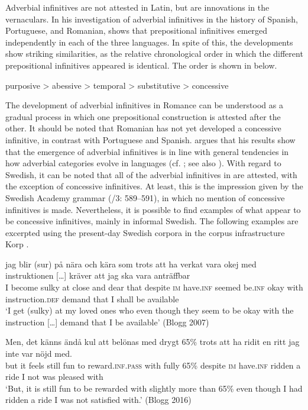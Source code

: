\documentclass[output=paper]{langscibook}
\begin{document}
Adverbial infinitives are not attested in Latin, but are innovations in the vernaculars. In his investigation of adverbial infinitives in the history of Spanish, Portuguese, and Romanian, \citet{Schulte2007Prepositional,Schulte2007What} shows that prepositional infinitives emerged independently in each of the three languages. In spite of this, the developments show striking similarities, as the relative chronological order in which the different prepositional infinitives appeared is identical. The order is shown in  below. 


\ea \label{ex:kalm:6}
purposive > abessive > temporal > substitutive > concessive
\z

The development of adverbial infinitives in Romance can be understood as a gradual process in which one prepositional construction is attested after the other. It should be noted that Romanian has not yet developed a concessive infinitive, in contrast with Portuguese and Spanish. \citet{Schulte2007Prepositional} argues that his results show that the emergence of adverbial infinitives is in line with general tendencies in how adverbial categories evolve in languages (cf. \citealt{Cristofaro2005}; see also ). With regard to Swedish, it can be noted that all of the adverbial infinitives in  are attested, with the exception of concessive infinitives. At least, this is the impression given by the Swedish Academy grammar (\citealt{TelemanEtAl1999}/3: 589–591), in which no mention of concessive infinitives is made. Nevertheless, it is possible to find examples of what appear to be concessive infinitives, mainly in informal Swedish. The following examples are excerpted using the present-day Swedish corpora in the corpus infrastructure Korp \citep{BorinEtAl2012}. 


\ea
\label{ex:kalm:7}
\ea  \label{ex:kalm:7a}
\gll jag blir (sur) på nära och kära som trots att ha verkat vara okej med {instruktionen […]} kräver att jag ska vara anträffbar\\
I become sulky at close and dear that despite \textsc{im} have.\textsc{inf} seemed be.\textsc{inf} okay with instruction.\textsc{def} demand that I shall be available\\ 
\glt ‘I get (sulky) at my loved ones who even though they seem to be okay with the instruction […] demand that I be available’ (Blogg 2007)

\ex  \label{ex:kalm:7b}
\gll Men, det känns ändå kul att belönas med drygt 65\% trots att ha ridit en ritt jag inte var nöjd med.\\
but it feels still fun to reward.\textsc{inf.pass} with fully 65\% despite \textsc{im} have.\textsc{inf} ridden a ride I not was pleased with\\ 
\glt ‘But, it is still fun to be rewarded with slightly more than 65\% even though I had ridden a ride I was not satisfied with.’ (Blogg 2016)
\z 
\z 
\end{document}
